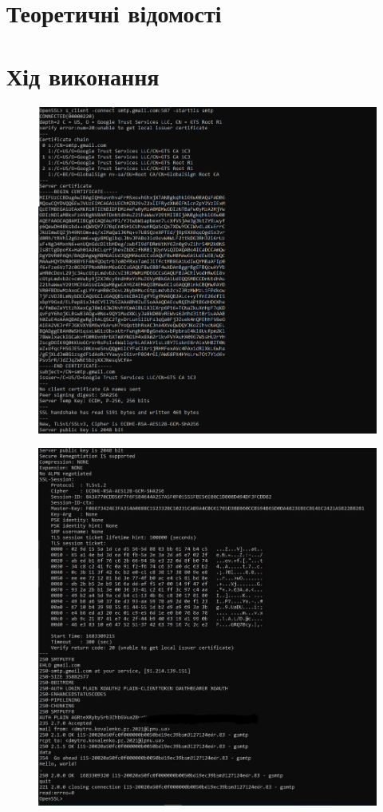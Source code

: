 \documentclass{article}
\begin{document}
\begin{normalsize}
\section*{Теоретичні відомості}


\section*{Хід виконання}
\begin{figure}[H]
	\centering
	\includegraphics[width=\textwidth]{11}
\end{figure}
\begin{figure}[H]
	\centering
	\includegraphics[width=\textwidth]{12}

\end{figure}
\end{normalsize}
\end{document}
